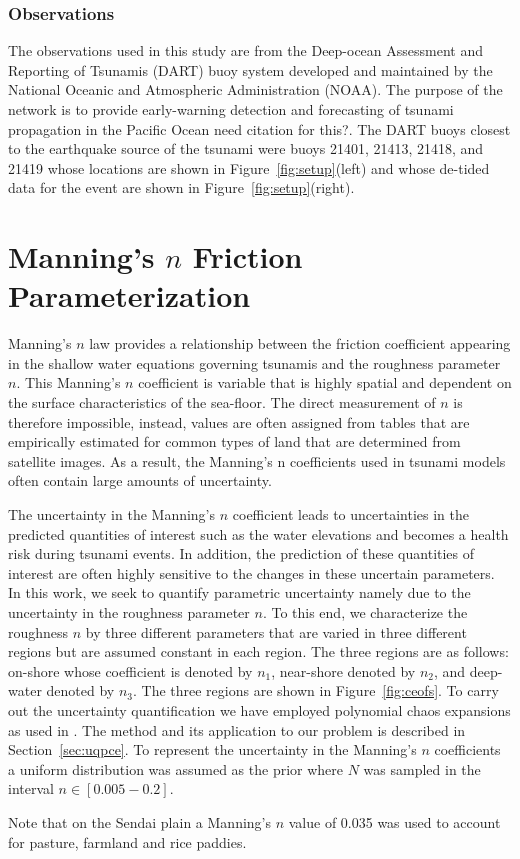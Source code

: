 \subsubsection{Observations}
The observations used in this study are from the Deep-ocean Assessment and Reporting of Tsunamis (DART) buoy system developed and maintained by the National Oceanic and Atmospheric Administration (NOAA).  The purpose of the network is to provide early-warning detection and forecasting of tsunami propagation in the Pacific Ocean \alert{need citation for this?}.  The DART buoys closest to the earthquake source of the \tohoku tsunami were buoys 21401, 21413, 21418, and 21419 whose locations are shown in Figure~\ref{fig:setup}(left) and whose de-tided data for the event are shown in Figure~\ref{fig:setup}(right).


\section{Manning’s $n$ Friction Parameterization}

Manning's $n$ law provides a relationship between the friction coefficient appearing in the shallow
water equations governing tsunamis and the roughness parameter $n$. 
This Manning's $n$ coefficient is variable that is highly spatial 
and dependent on the surface characteristics of the sea-floor. 
The direct measurement of $n$ is therefore impossible, instead, values
are often assigned from tables that are empirically estimated
for common types of land that are determined from satellite images.
As a result, the Manning’s n coefficients used in tsunami models
often contain large amounts of uncertainty.

The uncertainty in the Manning's $n$ coefficient leads to uncertainties
in the predicted quantities of interest such as the water elevations
and becomes a health risk during tsunami events. In addition, 
the prediction of these quantities of interest are often highly sensitive to 
the changes in these uncertain parameters. 
In this work, we seek to quantify parametric uncertainty namely due 
to the uncertainty in the roughness parameter $n$. To this end,
we characterize the roughness $n$ by three different parameters
that are varied in three different regions but are assumed
constant in each region. The three regions are as follows: 
on-shore whose coefficient is denoted by $n_1$, near-shore 
denoted by $n_2$, and deep-water denoted by $n_3$.
The three regions are shown in Figure~\ref{fig:ceofs}.
To carry out the uncertainty quantification we have employed polynomial chaos expansions 
as used in \cite{sraj:2013a,sraj:2013b}. The method and its application
to our problem is described in Section~\ref{sec:uqpce}.  
To represent the uncertainty in the Manning's $n$ coefficients a uniform distribution was assumed as the prior where $N$ was sampled in the interval $n \in [0.005-0.2]$.  

Note that on the Sendai plain a Manning's $n$ value of 0.035 was used to account for pasture, farmland and rice paddies.